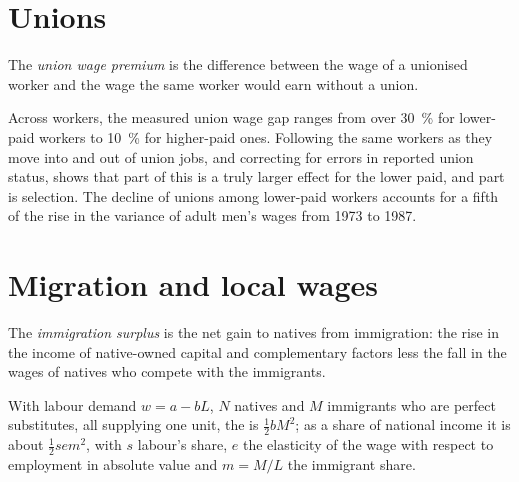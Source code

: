 \section{Unions}\label{sec:b3:wage-structure:unions}

\begin{definition}\label{def:b3:wage-structure:union}
The \emph{union wage premium} is the difference between the wage of a unionised
worker and the wage the same worker would earn without a union.
\end{definition}

\begin{measure}
Across workers, the measured union wage gap ranges from over 30~\% for lower-paid
workers to 10~\% for higher-paid ones. Following the same workers as they move into and
out of union jobs, and correcting for errors in reported union status, shows that
part of this is a truly larger effect for the lower paid, and part is selection.
The decline of unions among lower-paid workers accounts for a fifth of the rise in the
variance of adult men's wages from 1973 to 1987. %
\end{measure}

\section{Migration and local wages}\label{sec:b3:wage-structure:migration}

\begin{definition}\label{def:b3:wage-structure:immigration-surplus}
The \emph{immigration surplus} is the net gain to natives from immigration: the
rise in the income of native-owned capital and complementary factors less the
fall in the wages of natives who compete with the immigrants.
\end{definition}

\begin{proposition}\label{prop:b3:wage-structure:surplus}
With labour demand $w = a - bL$, $N$ natives and $M$ immigrants who are perfect substitutes,
all supplying one unit, the  is $\tfrac12bM^2$; as a share of national income
it is about $\tfrac12 s e m^2$, with $s$ labour's share, $e$ the elasticity of the wage with respect to
employment in absolute value and $m = M/L$ the immigrant share.
\end{proposition}

